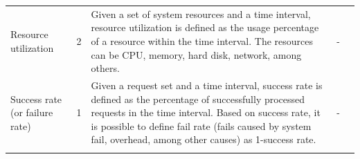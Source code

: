 {\begin{longtable}[c]{|p{0.9in}|c|p{2.3in}|p{2.3in}|c}
	\centering	Resource utilization           & 2     & Given a set of system resources and a time interval, resource utilization is defined as the usage percentage of a resource within the time interval. The resources can be CPU,   memory, hard disk, network, among others.                                                                                                                                                                                                                                                                                                                                                                                                                                                                         &   \centering  
	-                                                                                               & \\ \hhline{|-|-|-|-|}
	\centering	Success rate (or failure rate) & 1              & Given a request set and a time interval, success rate is defined as the percentage of successfully processed requests in the time interval. Based on success rate, it is possible to define fail rate (fails caused by system fail, overhead, among other causes) as 1-success rate.                                                                                                                                                                                                                                                                                                                                                                   & \centering -                                                                                                                                                                                                                                                                                                                                                                                                                                                                                                                                                                                                                                                                                                                                                    &   \\ \hhline{|-|-|-|-|} 

\end{longtable}}
